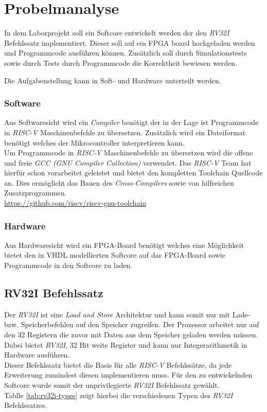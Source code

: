 \section{Probelmanalyse}
    In dem Laborprojekt soll ein Softcore entwickelt werden der den \textit{RV32I} Befehlssatz implementiert.
    Dieser soll auf ein FPGA board hochgeladen werden und Programmcode ausführen können.
    Zusätzlich soll durch Simulationstests sowie durch Tests durch Programmcode die Korrektheit
    bewiesen werden.

    Die Aufgabenstellung kann in Soft- und Hardware unterteilt werden.

        \subsubsection{Software}
            Aus Softwaresicht wird ein \textit{Compiler} benötigt der in der Lage ist Programmcode
            in \textit{RISC-V} Maschinenbefehle zu übersetzen. Zusätzlich wird ein Dateiformat benötigt
            welches der Mikrocontroller interpretieren kann.
            \\
            Um Programmcode in \textit{RISC-V} Maschinenbefehle zu übersetzen wird die 
            offene und freie \textit{GCC (GNU Compiler Collection)} verwendet.
            Das \textit{RISC-V} Team hat hierfür schon vorarbeitet geleistet und bietet
            den kompletten Toolchain Quellcode an.
            Dies ermöglicht das Bauen des \textit{Cross-Compilers} sowie von hilfreichen Zusatzprogrammen.
            \\
            \url{https://github.com/riscv/riscv-gnu-toolchain}

        \subsubsection{Hardware}
            Aus Hardwaresicht wird ein FPGA-Board benötigt welches eine Möglichkeit bietet
            den in VHDL modellierten Softcore auf das FPGA-Board sowie Programmcode
            in den Softcore zu laden.




    \subsection{RV32I Befehlssatz}
        Der \textit{RV32I} ist eine \textit{Load and Store} Architektur und kann somit nur mit
        Lade- bzw. Speicherbefehlen auf den Speicher zugreifen.
        Der Prozessor arbeitet nur auf den 32 Registern die zuvor mit Daten aus dem Speicher geladen werden müssen.
        Dabei bietet \textit{RV32I}, 32 Bit weite Register und kann nur Integerarithmetik in Hardware ausführen.
        \\
        Dieser Befehlssatz bietet die Basis für alle \textit{RISC-V} Befehlssätze,
        da jede Erweiterung zumindest diesen implementieren muss.
        Für den zu entwickelnden Softcore wurde somit der unprivilegierte \textit{RV32I} Befehlssatz gewählt.
        \\
        Tablle \ref{tab:rv32i-types} zeigt hierbei die verschiedenen Typen des \textit{RV32I} Befehlssatzes.
        

